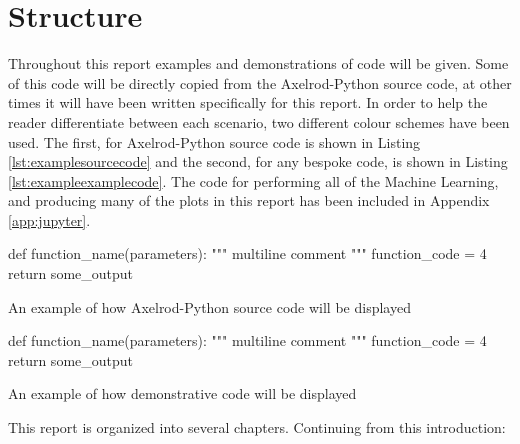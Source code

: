 \section{Structure}

Throughout this report examples and demonstrations of code will be given.
Some of this code will be directly copied from the Axelrod-Python source code, at other times it will have been written specifically for this report.
In order to help the reader differentiate between each scenario, two different colour schemes have been used.
The first, for Axelrod-Python source code is shown in Listing \ref{lst:examplesourcecode} and the second, for any bespoke code, is shown in Listing \ref{lst:exampleexamplecode}.
The code for performing all of the Machine Learning, and producing many of the plots in this report has been included in Appendix \ref{app:jupyter}.

\begin{listing}[hbtp!]
\begin{SourceCode}
def function_name(parameters):
    """
    multiline comment
    """
    function_code = 4
    return some_output
\end{SourceCode}
\caption{An example of how Axelrod-Python source code will be displayed}
\label{lst:examplesourcecode}
\end{listing}

\begin{listing}[hbtp!]
\begin{ExampleCode}
def function_name(parameters):
    """
    multiline comment
    """
    function_code = 4
    return some_output
\end{ExampleCode}
\caption{An example of how demonstrative code will be displayed}
\label{lst:exampleexamplecode}
\end{listing}{}

This report is organized into several chapters. Continuing from this introduction:

